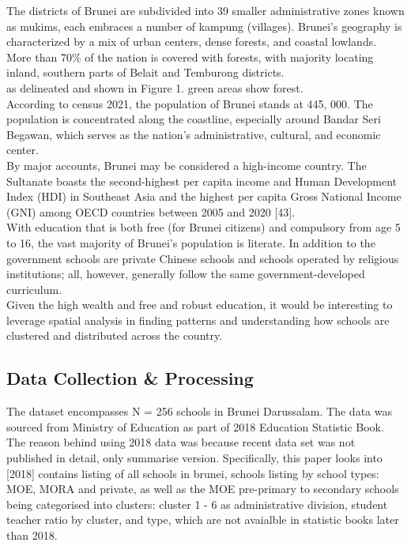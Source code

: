 \documentclass [12 pt]{article}
\begin{document}
The districts of Brunei are subdivided into 39 smaller administrative zones known as mukims, each embraces a number of kampung (villages). Brunei’s geography is characterized by a mix of urban centers, dense forests, and coastal lowlands. More than 70\% of the nation is covered with forests, with majority locating inland, southern parts of Belait and Temburong districts. \\

as delineated and shown in Figure 1. green areas show forest. \\

According to census 2021, the population of Brunei stands at 445, 000. The population is concentrated along the coastline, especially around Bandar Seri Begawan, which serves as the nation’s administrative, cultural, and economic center. \\

By major accounts, Brunei may be considered a high-income country. The Sultanate boasts the second-highest per capita income and Human Development Index (HDI) in Southeast Asia and the highest per capita Gross National Income (GNI) among OECD countries between 2005 and 2020 [43]. \\
 
With education that is both free (for Brunei citizens) and compulsory from age 5 to 16, the vast majority of Brunei’s population is literate. In addition to the government schools are private Chinese schools and schools operated by religious institutions; all, however, generally follow the same government-developed curriculum. \\

Given the high wealth and free and robust education, it would be interesting to leverage spatial analysis in finding patterns and understanding how schools are clustered and distributed across the country.\\

\subsection{Data Collection \& Processing}
The dataset encompasses N = 256 schools in Brunei Darussalam. The data was sourced from Ministry of Education as part of 2018 Education Statistic Book. The reason behind using 2018 data was because recent data set was not published in detail, only summarise version. Specifically, this paper looks into [2018] contains listing of all schools in brunei, schools listing by school types: MOE, MORA and private, as well as the MOE pre-primary to secondary schools being categorised into clusters: cluster 1 - 6 as administrative division, student teacher ratio by cluster, and type, which are not avaialble in statistic books later than 2018.  \\
\end{document}
